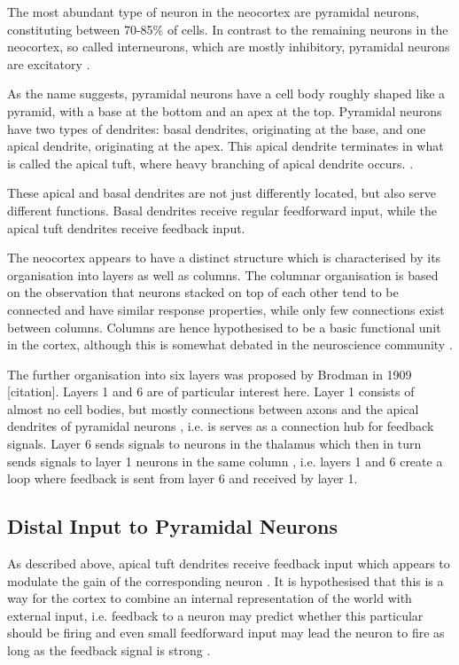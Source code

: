 \documentclass{article}
\begin{document}
The most abundant type of neuron in the neocortex are pyramidal neurons, constituting between 70-85\% of cells. In contrast to the remaining neurons in the neocortex, so called interneurons, which are mostly inhibitory, pyramidal neurons are excitatory \cite{defelipe1992}. 

As the name suggests, pyramidal neurons have a cell body roughly shaped like a pyramid, with a base at the bottom and an apex at the top. Pyramidal neurons have two types of dendrites: basal dendrites, originating at the base, and one apical dendrite, originating at the apex. This apical dendrite terminates in what is called the apical tuft, where heavy branching of apical dendrite occurs. \cite{defelipe1992}. 

These apical and basal dendrites are not just differently located, but also serve different functions. Basal dendrites receive regular feedforward input, while the apical tuft dendrites receive feedback input. 

The neocortex appears to have a distinct structure which is characterised by its organisation into layers as well as columns. The columnar organisation is based on the observation that neurons stacked on top of each other tend to be connected and have similar response properties, while only few connections exist between columns. Columns are hence hypothesised to be a basic functional unit in the cortex, although this is somewhat debated in the neuroscience community \cite{goodhill2002}.

The further organisation into six layers was proposed by Brodman in 1909 [citation]. Layers 1 and 6 are of particular interest here. Layer 1 consists of almost no cell bodies, but mostly connections between axons and the apical dendrites of pyramidal neurons \cite{shipp2007}, i.e. is serves as a connection hub for feedback signals. Layer 6 sends signals to neurons in the thalamus which then in turn sends signals to layer 1 neurons in the same column \cite{shipp2007}, i.e. layers 1 and 6 create a loop where feedback is sent from layer 6 and received by layer 1.  
\subsection{Distal Input to Pyramidal Neurons}
As described above, apical tuft dendrites receive feedback input which appears to modulate the gain of the corresponding neuron \cite{larkum2004}. It is hypothesised that this is a way for the cortex to combine an internal representation of the world with external input, i.e. feedback to a neuron may predict whether this particular should be firing and even small feedforward input may lead the neuron to fire as long as the feedback signal is strong \cite{larkum2013cellular}. 
\end{document}
